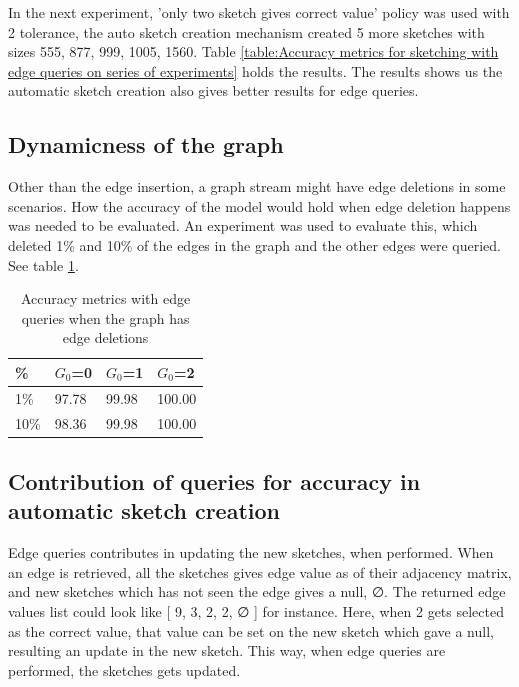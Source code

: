 \documentclass[conference]{IEEEtran}
\begin{document}
In the next experiment, 'only two sketch gives correct value' policy was used with 2 tolerance, the auto sketch creation mechanism created 5 more sketches with sizes 555, 877, 999, 1005, 1560. Table \ref{table:Accuracy metrics for sketching with edge queries on series of experiments} holds the results. The results shows us the automatic sketch creation also gives better results for edge queries.

\subsection{Dynamicness of the graph}

Other than the edge insertion, a graph stream might have edge deletions in some scenarios. How the accuracy of the model would hold when edge deletion happens was needed to be evaluated. An experiment was used to evaluate this, which deleted 1\% and 10\% of the edges in the graph and the other edges were queried. See table \ref{table:Accuracy metrics with edge queries when the graph has edge deletions}.


\begin{table}[!b]
\caption{Accuracy metrics with edge queries when the graph has edge deletions}
\label{table:Accuracy metrics with edge queries when the graph has edge deletions}
\centering
\begin{tabular}{|l|l|l|l|}
\hline
\%     & $G_0$=0 & $G_0$=1 & $G_0$=2 \\ \hline
1\% & 97.78   & 99.98   & 100.00   \\ \hline
10\% & 98.36   & 99.98   & 100.00   \\ \hline
\end{tabular}
\end{table}

\subsection{Contribution of queries for accuracy in automatic sketch creation}

Edge queries contributes in updating the new sketches, when performed. When an edge is retrieved, all the  sketches gives edge value as of their adjacency matrix, and new sketches which has not seen the edge gives a null, ∅. The returned edge values list could look like [ 9, 3, 2, 2, ∅ ] for instance. Here, when 2 gets selected as the correct value, that value can be set on the new sketch which gave a null, resulting an update in the new sketch. This way, when edge queries are performed, the sketches gets updated. 
\end{document}
